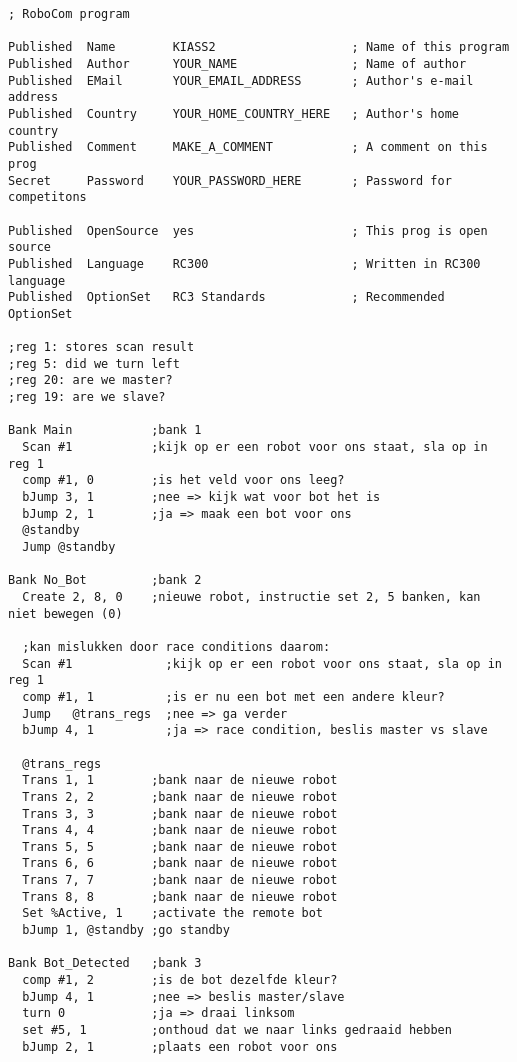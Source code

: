 \documentclass[10pt]{article}
\begin{document}
\smallskip

\begin{verbatim}; RoboCom program

Published  Name        KIASS2                   ; Name of this program
Published  Author      YOUR_NAME                ; Name of author
Published  EMail       YOUR_EMAIL_ADDRESS       ; Author's e-mail address
Published  Country     YOUR_HOME_COUNTRY_HERE   ; Author's home country
Published  Comment     MAKE_A_COMMENT           ; A comment on this prog
Secret     Password    YOUR_PASSWORD_HERE       ; Password for competitons

Published  OpenSource  yes                      ; This prog is open source
Published  Language    RC300                    ; Written in RC300 language
Published  OptionSet   RC3 Standards            ; Recommended OptionSet

;reg 1: stores scan result
;reg 5: did we turn left
;reg 20: are we master?
;reg 19: are we slave?

Bank Main           ;bank 1
  Scan #1           ;kijk op er een robot voor ons staat, sla op in reg 1
  comp #1, 0        ;is het veld voor ons leeg?
  bJump 3, 1        ;nee => kijk wat voor bot het is
  bJump 2, 1        ;ja => maak een bot voor ons
  @standby
  Jump @standby
  
Bank No_Bot         ;bank 2
  Create 2, 8, 0    ;nieuwe robot, instructie set 2, 5 banken, kan niet bewegen (0) 
  
  ;kan mislukken door race conditions daarom:
  Scan #1             ;kijk op er een robot voor ons staat, sla op in reg 1
  comp #1, 1          ;is er nu een bot met een andere kleur?  
  Jump   @trans_regs  ;nee => ga verder
  bJump 4, 1          ;ja => race condition, beslis master vs slave
  
  @trans_regs
  Trans 1, 1        ;bank naar de nieuwe robot
  Trans 2, 2        ;bank naar de nieuwe robot
  Trans 3, 3        ;bank naar de nieuwe robot
  Trans 4, 4        ;bank naar de nieuwe robot
  Trans 5, 5        ;bank naar de nieuwe robot
  Trans 6, 6        ;bank naar de nieuwe robot
  Trans 7, 7        ;bank naar de nieuwe robot
  Trans 8, 8        ;bank naar de nieuwe robot
  Set %Active, 1    ;activate the remote bot
  bJump 1, @standby ;go standby
  
Bank Bot_Detected   ;bank 3
  comp #1, 2        ;is de bot dezelfde kleur?
  bJump 4, 1        ;nee => beslis master/slave
  turn 0            ;ja => draai linksom
  set #5, 1         ;onthoud dat we naar links gedraaid hebben
  bJump 2, 1        ;plaats een robot voor ons
  

\end{verbatim}
\end{document}
